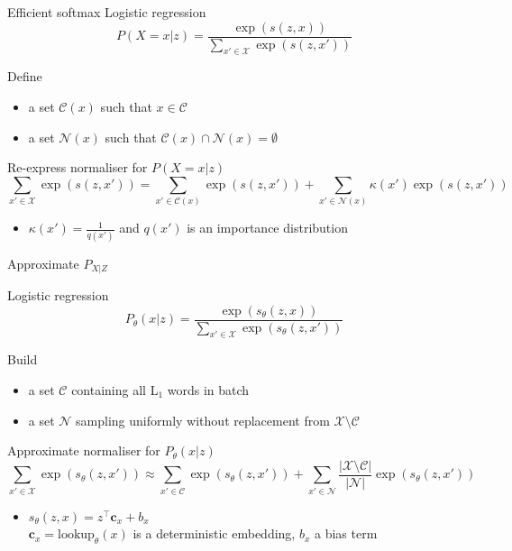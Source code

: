 \begin{frame}{Efficient softmax}
Logistic regression
\begin{equation*}
P(X=x|z) = \frac{\exp(s(z, x))}{\sum_{x'\in \mathcal X} \exp(s(z, x'))}
\end{equation*}

\pause

Define
\begin{itemize}
	\item a set $\mathcal C(x)$ such that $x \in \mathcal C$
	\item a set $\mathcal N(x)$ such that $\mathcal C(x) \cap \mathcal N(x) = \emptyset$
\end{itemize}

\pause 
Re-express normaliser for $P(X=x|z)$ 
\begin{equation*}
\sum_{x'\in \mathcal X} \exp(s(z, x')) = \sum_{x'\in \mathcal C(x)} \exp(s(z, x')) + \sum_{x'\in \mathcal N(x)} \kappa(x')\exp(s(z, x'))
\end{equation*}
\begin{itemize}
	\item $\kappa(x') = \frac{1}{q(x')}$ and $q(x')$ is an importance distribution
\end{itemize}

\end{frame}

\begin{frame}{Approximate $P_{X|Z}$}

Logistic regression
\begin{equation*}
P_\theta(x|z) = \frac{\exp(s_\theta(z, x))}{\sum_{x'\in \mathcal X} \exp(s_\theta(z, x'))}
\end{equation*}

\pause

Build
\begin{itemize}
	\item a set $\mathcal C$ containing all L$_1$ words in batch
	\item a set $\mathcal N$ sampling uniformly without replacement from $\mathcal X \setminus \mathcal C$
\end{itemize}

\pause 
Approximate normaliser for $P_\theta(x|z)$
\begin{equation*}
\sum_{x'\in \mathcal X} \exp(s_\theta(z, x')) \approx \sum_{x'\in \mathcal C} \exp(s_\theta(z, x')) + \sum_{x'\in \mathcal N} \frac{|\mathcal X \setminus \mathcal C|}{|\mathcal N|}\exp(s_\theta(z, x'))
\end{equation*}
\begin{itemize}
	\item $s_\theta(z, x) = z^\top \mathbf c_x + b_x$ \\
	$\mathbf c_x = \text{lookup}_\theta(x)$ is a deterministic embedding, $b_x$ a bias term
\end{itemize}

\end{frame}

